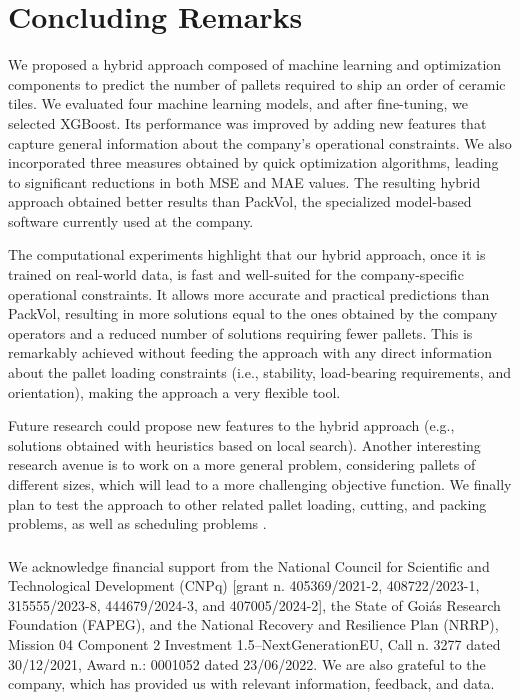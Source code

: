 \documentclass[runningheads]{llncs}
\newcommand{\rev}[1]{{#1}}
\begin{document}
\section{Concluding Remarks \label{sec6}}

\rev{We proposed a hybrid approach composed of machine learning and optimization components to predict the number of pallets required to ship an order of ceramic tiles. We evaluated four machine learning models, and after fine-tuning, we selected XGBoost. Its performance was improved by adding new features that capture general information about the company's operational constraints. We also incorporated three measures obtained by quick optimization algorithms, leading to significant reductions in both MSE and MAE values. The resulting hybrid approach obtained better results than PackVol, the specialized model-based software currently used at the company. 

The computational experiments highlight that our hybrid approach, once it is trained on real-world data, is fast and well-suited for the company-specific operational constraints. It allows more accurate and practical predictions than PackVol, resulting in more solutions equal to the ones obtained by the company operators and a reduced number of solutions requiring fewer pallets. This is remarkably achieved without feeding the approach with any direct information about the pallet loading constraints (i.e., stability, load-bearing requirements, and orientation), making the approach a very flexible tool.}

\rev{Future research could propose new features to the hybrid approach (e.g., solutions obtained with heuristics based on local search). Another interesting research avenue is to work on a more general problem, considering pallets of different sizes, which will lead to a more challenging objective function. We finally plan to test the approach to other related pallet loading, cutting, and packing problems, as well as scheduling problems \cite{BLM2024,QM2020}.}


\subsubsection{\ackname} 

We acknowledge financial support from the National Council for Scientific and Technological Development (CNPq) [grant n. 405369/2021-2, 408722/2023-1, 315555/2023-8, 444679/2024-3, and 407005/2024-2], the State of Goi\'as Research Foundation (FAPEG), and the National Recovery and Resilience Plan (NRRP), Mission 04 Component 2 Investment 1.5–NextGenerationEU, Call n. 3277 dated 30/12/2021, Award n.: 0001052 dated 23/06/2022. We are also grateful to the company, which has provided us with relevant information, feedback, and data.



\end{document}
